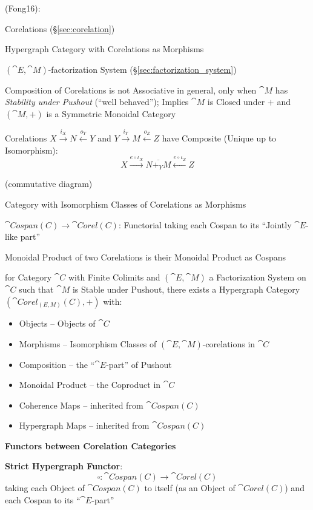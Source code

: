 (Fong16):

Corelations (\S\ref{sec:corelation})

Hypergraph Category with Corelations as Morphisms

$(\cat{E},\cat{M})$-factorization System
(\S\ref{sec:factorization_system})

Composition of Corelations is not Associative in general, only when
$\cat{M}$ has \emph{Stability under Pushout} (``well behaved'');
Implies $\cat{M}$ is Closed under $+$ and $(\cat{M},+)$ is a Symmetric
Monoidal Category

Corelations $X \xrightarrow{i_X} N \xleftarrow{o_Y} Y$ and $Y
\xrightarrow{i_Y} M \xleftarrow{o_Z} Z$ have Composite (Unique up to
Isomorphism):
\[
  X \xrightarrow{e\circ\iota_X} \overline{N +_Y M}
    \xleftarrow{e\circ\iota_Z} Z
\]

(commutative diagram) %

Category with Isomorphism Classes of Corelations as Morphisms

$\cat{Cospan(C)} \rightarrow \cat{Corel(C)}$: Functorial taking each
Cospan to its ``Jointly $\cat{E}$-like part''

Monoidal Product of two Corelations is their Monoidal Product as
Cospans

for Category $\cat{C}$ with Finite Colimits and $(\cat{E},\cat{M})$ a
Factorization System on $\cat{C}$ such that $\cat{M}$ is Stable under
Pushout, there exists a Hypergraph Category $(\cat{Corel_{(E,M)}(C)},
+)$ with:
\begin{itemize}
  \item Objects -- Objects of $\cat{C}$
  \item Morphisms -- Isomorphism Classes of
    $(\cat{E},\cat{M})$-corelations in $\cat{C}$
  \item Composition -- the ``$\cat{E}$-part'' of Pushout %
  \item Monoidal Product -- the Coproduct in $\cat{C}$
  \item Coherence Maps -- inherited from $\cat{Cospan(C)}$
  \item Hypergraph Maps -- inherited from $\cat{Cospan(C)}$
\end{itemize}


\textbf{Functors between Corelation Categories}


\textbf{Strict Hypergraph Functor}:
\[
  \square : \cat{Cospan(C)} \rightarrow \cat{Corel(C)}
\]
taking each Object of $\cat{Cospan(C)}$ to itself (as an Object of
$\cat{Corel(C)}$) and each Cospan to its ``$\cat{E}$-part''


